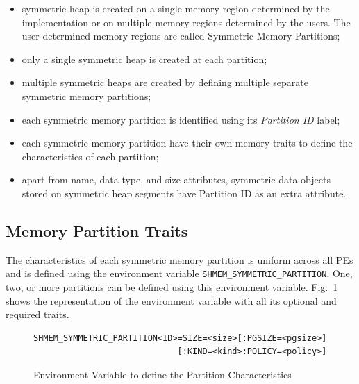 \begin{itemize}
    \item symmetric heap is created on a single memory region
    determined by the implementation or on multiple memory regions
    determined by the users. The user-determined memory regions are
    called Symmetric Memory Partitions;
    \item only a single symmetric heap is created at each partition;
    \item multiple symmetric heaps are created by defining
    multiple separate symmetric memory partitions;
    \item each symmetric memory partition is identified using its
    \emph{Partition ID} label;
    \item each symmetric memory partition have their own memory
    traits to define the characteristics of each partition;
    \item apart from name, data type, and size attributes, symmetric
    data objects stored on symmetric heap segments have Partition ID
    as an extra attribute.
\end{itemize}

\subsection{Memory Partition Traits}
\label{src:smempart/traits}
The characteristics of each symmetric memory partition is uniform
across all PEs and is defined using the environment variable
\texttt{SHMEM\_SYMMETRIC\_PARTITION}. One, two, or more partitions
can be defined using this environment variable. Fig.~\ref{fig:env}
shows the representation of the %
environment variable with all its optional and required traits.

\begin{figure}
    \lstset{language=c,
            keywordstyle=\bfseries,
            basicstyle=\tt\small,
            frame=single}
    \vspace{-20pt}
    \begin{lstlisting}
SHMEM_SYMMETRIC_PARTITION<ID>=SIZE=<size>[:PGSIZE=<pgsize>]
                             [:KIND=<kind>:POLICY=<policy>]
    \end{lstlisting}
    \vspace{-10pt}
    \caption{Environment Variable to define the Partition
    Characteristics}
    \vspace{-20pt}
    \label{fig:env}
\end{figure}

